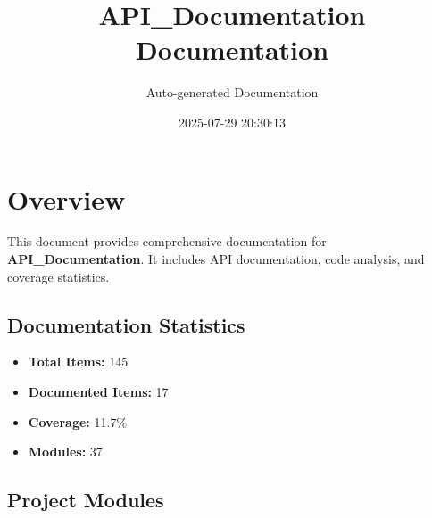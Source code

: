 \documentclass[11pt,a4paper]{article}
\title{API\_Documentation\\Documentation}
\author{Auto-generated Documentation}
\date{2025-07-29 20:30:13}
\begin{document}
\maketitle
\thispagestyle{empty}

\newpage
\tableofcontents
\newpage

\section{Overview}

This document provides comprehensive documentation for \textbf{API\_Documentation}. It includes API documentation, code analysis, and coverage statistics.

\subsection{Documentation Statistics}

\begin{itemize}
    \item \textbf{Total Items:} 145
    \item \textbf{Documented Items:} 17
    \item \textbf{Coverage:} 11.7\%
    \item \textbf{Modules:} 37
\end{itemize}

\subsection{Project Modules}
\end{document}
